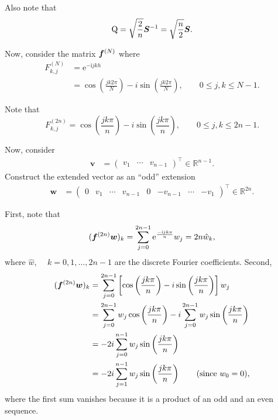 Also note that
\begin{align*}
  {\mathrm Q} = \sqrt{\frac{2}{n}} \boldsymbol S^{-1} = \sqrt{\frac{n}{2}} \boldsymbol S.
\end{align*}

Now, consider the matrix ${\boldsymbol f}^{(N)}$ where
\begin{equation*}
  \begin{split}
    F_{k,j}^{(N)} &= \text{e}^{-\text{i}jkh} \\
    &= \cos \left( \frac{j k 2 \pi}{N} \right) -
    i \sin \left( \frac{j k 2 \pi}{N} \right),
    \qquad 0 \leq j,k \leq N-1.
  \end{split}
\end{equation*}

Note that
\begin{equation*}
  F_{k,j}^{(2 n)} = \cos \left( \frac{j k \pi}{n} \right)
  - i \sin \left( \frac{j k \pi}{n} \right), \qquad 0 \leq j,k \leq 2n-1.
\end{equation*}

Now, consider
\begin{align*}
  \bm v &= \begin{pmatrix} v_1 & \cdots & v_{n-1} \end{pmatrix}^\intercal \in \mathbb{R}^{n-1}.
\end{align*}
Construct the extended vector as an ``odd'' extension
\begin{align*}
  \bm w &= \begin{pmatrix} 0 & v_1 & \cdots & v_{n-1} & 0 & -v_{n-1} & \cdots & -v_1 \end{pmatrix}^\intercal
  \in \mathbb{R}^{2n}.
\end{align*}

First, note that
\begin{equation*}
  ({\boldsymbol f}^{(2n)} \boldsymbol w)_k
  = \sum_{j=0}^{2n-1} \text{e}^{\frac{-\text{i}jk \pi}{n}} w_j
  = 2n \hat{w}_k,
\end{equation*}
where $\hat{w}$, $\quad k=0,1,\ldots,2n-1$ are the discrete Fourier coefficients. Second,
\begin{align*}
  ({\boldsymbol f}^{(2n)} \boldsymbol w)_k
  &= \sum_{j=0}^{2n-1} \left[
    \cos \left( \frac{j k \pi}{n} \right)
    - i \sin \left( \frac{jk \pi}{n} \right)
    \right] w_j \\
  &= \sum_{j=0}^{2n-1} w_j \cos \left( \frac{jk \pi}{n} \right)
    - i \sum_{j=0}^{2n-1} w_j \sin \left( \frac{j k \pi}{n} \right) \\
  &= -2i \sum_{j=0}^{n-1} w_j \sin \left( \frac{j k \pi}{n} \right) \\
  &= -2i \sum_{j=1}^{n-1} w_j \sin \left( \frac{j k \pi}{n} \right) \qquad (\text{since } w_0=0),
\end{align*}
where the first sum vanishes because it is a product of an odd and an even sequence.

